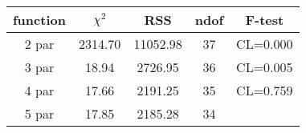 \begin{tabular}{c|c|c|c|c}
function & $\chi^2$ & RSS & ndof & F-test \\
\hline
2 par & 2314.70 & 11052.98 & 37 & CL=0.000 \\
3 par & 18.94 & 2726.95 & 36 & CL=0.005 \\
4 par & 17.66 & 2191.25 & 35 & CL=0.759 \\
5 par & 17.85 & 2185.28 & 34 & \\
\hline
\end{tabular}